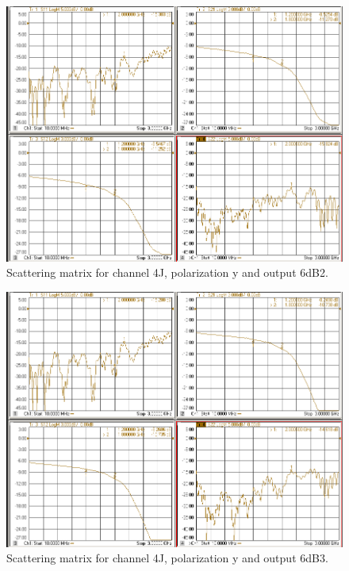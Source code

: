 \documentclass[12pt,a4paper,oneside]{article}
\begin{document}
\begin{figure}[H]
\centering
\includegraphics[width=0.9\linewidth]{VNA_results/4Jy_6dB2.png}
\caption{Scattering matrix for channel 4J, polarization y and output 6dB2.}
\label{fig:4Jy_6dB2}
\end{figure}


\begin{figure}[H]
\centering
\includegraphics[width=0.9\linewidth]{VNA_results/4Jy_6dB3.png}
\caption{Scattering matrix for channel 4J, polarization y and output 6dB3.}
\label{fig:4Jy_6dB3}
\end{figure}
\end{document}

